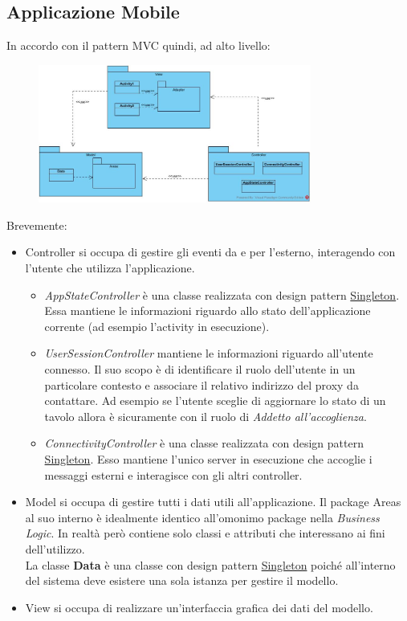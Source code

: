 \subsection{Applicazione Mobile}
In accordo con il pattern MVC quindi, ad alto livello:
\begin{figure}[H]
	\centering
	\includegraphics[width=0.8\textwidth]{Immagini/android_classdiagram.jpg}
\end{figure}
Brevemente:
\begin{itemize}
	\item Controller si occupa di gestire gli eventi da e per l'esterno, interagendo con l'utente che utilizza l'applicazione.
	\begin{itemize}
		\item \textit{AppStateController} è una classe realizzata con design pattern \underline{Singleton}. Essa mantiene le informazioni riguardo allo stato dell'applicazione corrente (ad esempio l'activity in esecuzione).
		\item \textit{UserSessionController} mantiene le informazioni riguardo all'utente connesso. Il suo scopo è di identificare il ruolo dell'utente in un particolare contesto e associare il relativo indirizzo del proxy da contattare. Ad esempio se l'utente sceglie di aggiornare lo stato di un tavolo allora è sicuramente con il ruolo di \textit{Addetto all'accoglienza}.
		\item \textit{ConnectivityController} è una classe realizzata con design pattern \underline{Singleton}. Esso mantiene l'unico server in esecuzione che accoglie i messaggi esterni e interagisce con gli altri controller.
	\end{itemize}
	\item Model si occupa di gestire tutti i dati utili all'applicazione. Il package Areas al suo interno è idealmente identico all'omonimo package nella \textit{Business Logic}. In realtà però contiene solo classi e attributi che interessano ai fini dell'utilizzo.
	\\La classe \textbf{Data} è una classe con design pattern \underline{Singleton} poiché all'interno del sistema deve esistere una sola istanza per gestire il modello.
	\item View si occupa di realizzare un'interfaccia grafica dei dati del modello.
\end{itemize}


